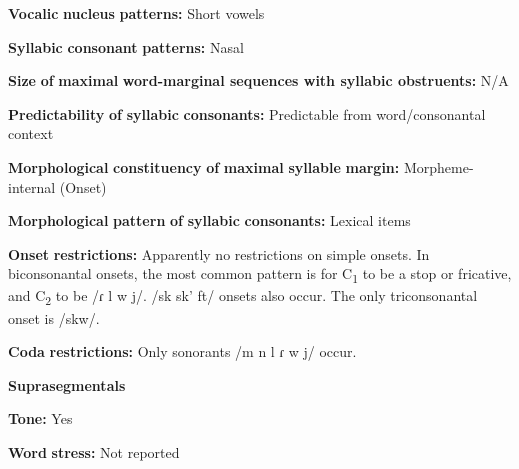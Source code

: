 \begin{styleBody}
\textbf{Vocalic} \textbf{nucleus} \textbf{patterns:} Short vowels
\end{styleBody}

\begin{styleBody}
\textbf{Syllabic} \textbf{consonant} \textbf{patterns:} Nasal
\end{styleBody}

\begin{styleBody}
\textbf{Size} \textbf{of} \textbf{maximal} \textbf{word{}-marginal sequences with syllabic obstruents:} N/A
\end{styleBody}

\begin{styleBody}
\textbf{Predictability} \textbf{of} \textbf{syllabic} \textbf{consonants:} Predictable from word/consonantal context
\end{styleBody}

\begin{styleBody}
\textbf{Morphological} \textbf{constituency} \textbf{of} \textbf{maximal} \textbf{syllable} \textbf{margin:} Morpheme-internal (Onset)
\end{styleBody}

\begin{styleBody}
\textbf{Morphological} \textbf{pattern} \textbf{of} \textbf{syllabic} \textbf{consonants:} Lexical items
\end{styleBody}

\begin{styleBody}
\textbf{Onset} \textbf{restrictions:} Apparently no restrictions on simple onsets. In biconsonantal onsets, the most common pattern is for C\textsubscript{1} to be a stop or fricative, and C\textsubscript{2} to be /ɾ l w j/. /sk sk’ ft/ onsets also occur. The only triconsonantal onset is /skw/.
\end{styleBody}

\begin{styleBody}
\textbf{Coda} \textbf{restrictions:} Only sonorants /m n l ɾ w j/ occur.
\end{styleBody}

\begin{styleBody}
\textbf{Suprasegmentals}
\end{styleBody}

\begin{styleBody}
\textbf{Tone:} Yes
\end{styleBody}

\begin{styleBody}
\textbf{Word} \textbf{stress:} Not reported
\end{styleBody}

